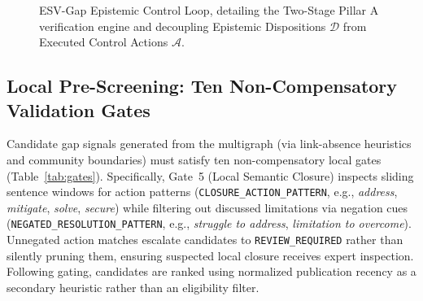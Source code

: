 \documentclass[runningheads]{llncs}
\newcommand{\method}{ESV-Gap}
\begin{document}
\begin{figure}[t]
{%
}
\caption{\method{} Epistemic Control Loop, detailing the Two-Stage Pillar A verification engine and decoupling Epistemic Dispositions $\mathcal{D}$ from Executed Control Actions $\mathcal{A}$.}
\label{fig:arch}
\end{figure}

\subsection{Local Pre-Screening: Ten Non-Compensatory Validation Gates}
Candidate gap signals generated from the multigraph (via link-absence heuristics and community boundaries) must satisfy ten non-compensatory local gates (Table~\ref{tab:gates}). Specifically, Gate~5 (Local Semantic Closure) inspects sliding sentence windows for action patterns (\texttt{CLOSURE\_ACTION\_PATTERN}, e.g., \emph{address}, \emph{mitigate}, \emph{solve}, \emph{secure}) while filtering out discussed limitations via negation cues (\texttt{NEGATED\_}\allowbreak\texttt{RESOLUTION\_}\allowbreak\texttt{PATTERN}, e.g., \emph{struggle to address}, \emph{limitation to overcome}). Unnegated action matches escalate candidates to \texttt{REVIEW\_\allowbreak REQUIRED} rather than silently pruning them, ensuring suspected local closure receives expert inspection. Following gating, candidates are ranked using normalized publication recency as a secondary heuristic rather than an eligibility filter.
\end{document}
